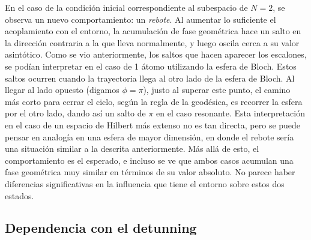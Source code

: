 En el caso de la condición inicial correspondiente al subespacio de $N=2$, se observa un nuevo comportamiento: un \textit{rebote}. Al aumentar lo suficiente el acoplamiento con el entorno, la acumulación de fase geométrica hace un salto en la dirección contraria a la que lleva normalmente, y luego oscila cerca a su valor asintótico. Como se vio anteriormente, los saltos que hacen aparecer los escalones, se podían interpretar en el caso de 1 átomo utilizando la esfera de Bloch. Estos saltos ocurren cuando la trayectoria llega al otro lado de la esfera de Bloch. Al llegar al lado opuesto (digamos $\phi=\pi$), justo al superar este punto, el camino más corto para cerrar el ciclo, según la regla de la geodésica, es recorrer la esfera por el otro lado, dando así un salto de $\pi$ en el caso resonante. Esta interpretación en el caso de un espacio de Hilbert más extenso no es tan directa, pero se puede pensar en analogía en una esfera de mayor dimensión, en donde el rebote sería una situación similar a la descrita anteriormente. Más allá de esto, el comportamiento es el esperado, e incluso se ve que ambos casos acumulan una fase geométrica muy similar en términos de su valor absoluto. No parece haber diferencias significativas en la influencia que tiene el entorno sobre estos dos estados.

\subsection{Dependencia con el detunning}

